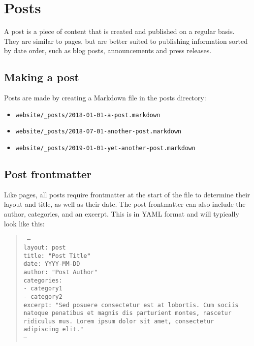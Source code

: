 \chapter{Posts}

A post is a piece of content that is created and published on a regular basis. They are similar to pages, but are better suited to publishing information sorted by date order, such as blog posts, announcements and press releases.

\section{Making a post}

Posts are made by creating a Markdown file in the posts directory:

\begin{itemize}
  \item \texttt{website/\_posts/2018-01-01-a-post.markdown}
  \item \texttt{website/\_posts/2018-07-01-another-post.markdown}
  \item \texttt{website/\_posts/2019-01-01-yet-another-post.markdown}
\end{itemize}

\section{Post frontmatter}

Like pages, all posts require frontmatter at the start of the file to determine their layout and title, as well as their date. The post frontmatter can also include the author, categories, and an excerpt. This is in YAML format and will typically look like this:

\begin{quote}
  \texttt{%
    ---\\
    layout: post\\
    title: "Post Title"\\
    date: YYYY-MM-DD\\
    author: "Post Author"\\
    categories:\\
    - category1\\
    - category2\\
    excerpt: "Sed posuere consectetur est at lobortis. Cum sociis natoque penatibus et magnis dis parturient montes, nascetur ridiculus mus. Lorem ipsum dolor sit amet, consectetur adipiscing elit."\\
    ---
  }
\end{quote}

